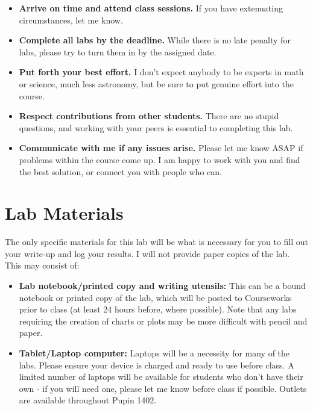 \documentclass[11pt]{article}
\begin{document}
\begin{itemize}
\item \textbf{Arrive on time and attend class sessions.} If you have extenuating circumstances, let me know. 
\item \textbf{Complete all labs by the deadline.} While there is no late penalty for labs, please try to turn them in by the assigned date.
\item \textbf{Put forth your best effort.} I don't expect anybody to be experts in math or science, much less astronomy, but be sure to put genuine effort into the course.
\item \textbf{Respect contributions from other students.} There are no stupid questions, and working with your peers is essential to completing this lab.
\item \textbf{Communicate with me if any issues arise.} Please let me know ASAP if problems within the course come up. I am happy to work with you and find the best solution, or connect you with people who can.
\end{itemize}

\section*{Lab Materials}
 
The only specific materials for this lab will be what is necessary for you to fill out your write-up and log your results. I will not provide paper copies of the lab. This may consist of:
 
\begin{itemize}
\item \textbf{Lab notebook/printed copy and writing utensils:} This can be a bound notebook or printed copy of the lab, which will be posted to Courseworks prior to class (at least 24 hours before, where possible). Note that any labs requiring the creation of charts or plots may be more difficult with pencil and paper.
\item \textbf{Tablet/Laptop computer:} Laptops will be a necessity for many of the labs. Please ensure your device is charged and ready to use before class. A limited number of laptops will be available for students who don't have their own - if you will need one, please let me know before class if possible. Outlets are available throughout Pupin 1402. \\
\end{itemize}
\end{document}
